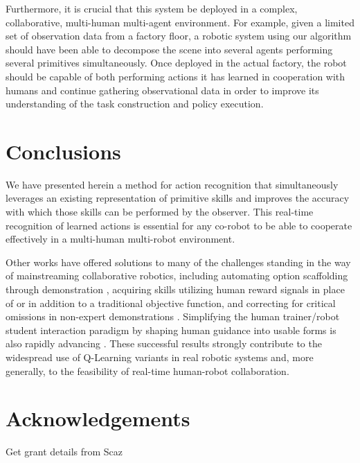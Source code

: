 \documentclass[letterpaper]{article}
\begin{document}
Furthermore, it is crucial that this system be deployed in a complex, collaborative, multi-human multi-agent environment.  For example, given a limited set of observation data from a factory floor, a robotic system using our algorithm should have been able to decompose the scene into several agents performing several primitives simultaneously.  Once deployed in the actual factory, the robot should be capable of both performing actions it has learned in cooperation with humans and continue gathering observational data in order to improve its understanding of the task construction and policy execution.


\section{Conclusions}
\label{sec:conclusions}
We have presented herein a method for action recognition that simultaneously leverages an existing representation of primitive skills and improves the accuracy with which those skills can be performed by the observer.  This real-time recognition of learned actions is essential for any co-robot to be able to cooperate effectively in a multi-human multi-robot environment.

Other works have offered solutions to many of the challenges standing in the way of mainstreaming collaborative robotics, including automating option scaffolding through demonstration \cite{AutoSkillAcquisition}, acquiring skills utilizing human reward signals in place of \cite{TAMER} or in addition to \cite{TeacherRL} a traditional objective function, and correcting for critical omissions in non-expert demonstrations \cite{PerspectiveTaking}. Simplifying the human trainer/robot student interaction paradigm by shaping human guidance into usable forms is also rapidly advancing \cite{TAMER,Clicker,AdviceTaking,TeacherRL,DemonstrationRL}. These successful results strongly contribute to the widespread use of Q-Learning variants in real robotic systems and, more generally, to the feasibility of real-time human-robot collaboration.

\section{Acknowledgements}
\label{sec:acknowledgements}
Get grant details from Scaz



\end{document}
